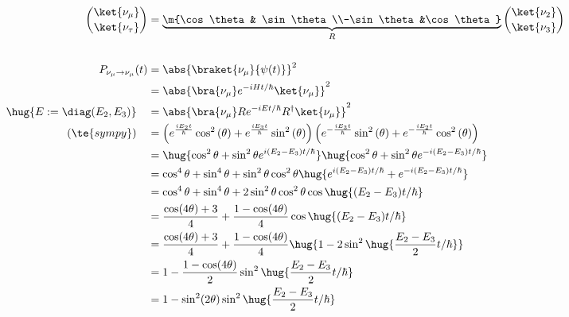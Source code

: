 \documentclass[exb]{exercise_5.0}
\begin{document}
\subsection{}
\begin{align*}
    \binom{\ket{\nu_\mu}}{\ket{\nu_\tau}} &= \underbrace{\m{\cos\theta& \sin\theta\\-\sin\theta&\cos\theta}}_R \binom{\ket{\nu_2}}{\ket{\nu_3}}\\
    \\
    P_{\nu_\mu\to \nu_\mu} (t) 
    &= \abs{\braket{\nu_\mu}{\psi(t)}}^2\\
    &= \abs{\bra{\nu_\mu} e^{-iHt/\hbar}\ket{\nu_\mu}}^2\\
    \hug{E := \diag(E_2,E_3)}\quad &= \abs{\bra{\nu_\mu} R e^{-iEt/\hbar}R^\dagger \ket{\nu_\mu}}^2\\
    (\te{sympy})\quad&= \left(e^{\frac{i E_{2} t}{\hbar}} \cos^{2}{\left(\theta \right)} + e^{\frac{i E_{3} t}{\hbar}} \sin^{2}{\left(\theta \right)}\right) \left(e^{- \frac{i E_{3} t}{\hbar}} \sin^{2}{\left(\theta \right)} + e^{- \frac{i E_{2} t}{\hbar}} \cos^{2}{\left(\theta \right)}\right)\\
    &= \hug{\cos^2\theta+ \sin^2\theta e^{i(E_2 - E_3) t/\hbar}}\hug{\cos^2\theta+ \sin^2\theta e^{-i(E_2 - E_3) t/\hbar}}\\
    &= \cos^4\theta + \sin^4\theta + \sin^2\theta\cos^2\theta \hug{e^{i(E_2 - E_3) t/\hbar} + e^{-i(E_2 - E_3) t/\hbar}}\\
    &= \cos^4\theta + \sin^4\theta + 2\sin^2\theta\cos^2\theta \cos\hug{(E_2 - E_3) t/\hbar}\\
    &= \frac{\cos(4\theta) + 3}{4} + \frac{1-\cos(4\theta)}{4}\cos\hug{(E_2 - E_3) t/\hbar}\\
    &= \frac{\cos(4\theta) + 3}{4} + \frac{1-\cos(4\theta)}{4}\hug{1- 2\sin^2\hug{\frac {E_2 - E_3}2 t/\hbar}}\\
    &= 1 - \frac{1-\cos(4\theta)}{2}\sin^2\hug{\frac {E_2 - E_3}2 t/\hbar}\\
    &= 1 - \sin^2(2\theta)\sin^2\hug{\frac {E_2 - E_3}2 t/\hbar}
\end{align*}
  
\end{document}
